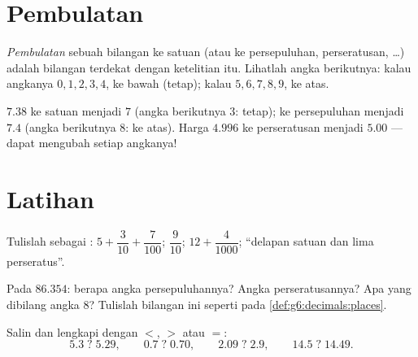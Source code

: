 \section{Pembulatan}

\begin{definition}[Pembulatan]\label{def:g6:decimals:rounding}
\emph{Pembulatan} sebuah bilangan ke satuan (atau
ke persepuluhan, perseratusan, \dots) adalah bilangan terdekat dengan
ketelitian itu. Lihatlah angka berikutnya: kalau angkanya $0,1,2,3,4$,
 ke bawah (tetap); kalau $5,6,7,8,9$,  ke atas.
\end{definition}

\begin{example}
$7.38$  ke satuan menjadi $7$ (angka berikutnya $3$:
tetap);  ke persepuluhan menjadi $7.4$ (angka berikutnya
$8$:  ke atas). Harga $4.996$  ke perseratusan
menjadi $5.00$ ---  dapat mengubah setiap angkanya!
\end{example}

\section{Latihan}

\begin{exercise}[$\star$]\label{exo:g6:decimals:1}
Tulislah sebagai : $5 + \dfrac{3}{10} + \dfrac{7}{100}$;
\quad $\dfrac{9}{10}$; \quad $12 + \dfrac{4}{1000}$;
\quad ``delapan satuan dan lima perseratus''.
\end{exercise}

\begin{exercise}[$\star$]\label{exo:g6:decimals:2}
Pada $86.354$: berapa angka persepuluhannya? Angka perseratusannya?
Apa yang dibilang angka $8$? Tulislah bilangan ini seperti pada
\cref{def:g6:decimals:places}.
\end{exercise}

\begin{exercise}[$\star$]\label{exo:g6:decimals:3}
Salin dan lengkapi dengan $<$, $>$ atau $=$:
\[
5.3 \;?\; 5.29, \qquad
0.7 \;?\; 0.70, \qquad
2.09 \;?\; 2.9, \qquad
14.5 \;?\; 14.49 .
\]
\end{exercise}

